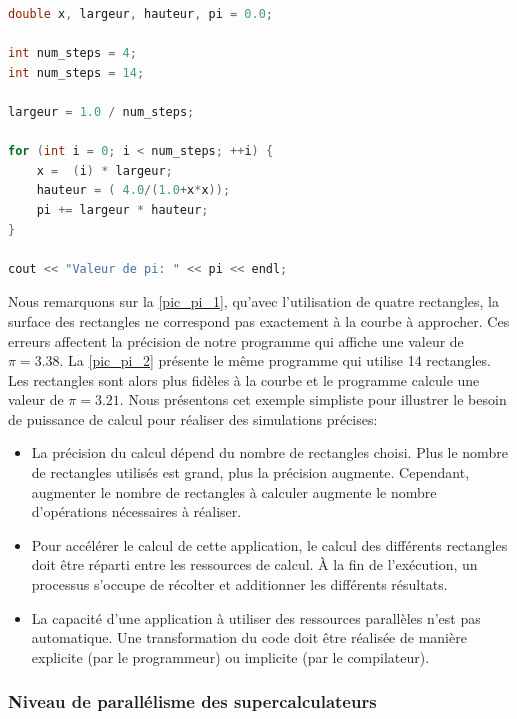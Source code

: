         \begin{lstlisting}[language=C, caption=Implémentation de l'algorithme de calcul d'intégrale par la méthode des rectangles, float,floatplacement=H]
double x, largeur, hauteur, pi = 0.0;

int num_steps = 4;
int num_steps = 14;

largeur = 1.0 / num_steps;

for (int i = 0; i < num_steps; ++i) {
    x =  (i) * largeur;
    hauteur = ( 4.0/(1.0+x*x));
    pi += largeur * hauteur;
}

cout << "Valeur de pi: " << pi << endl;
\end{lstlisting}
    
         Nous remarquons sur la \autoref{pic_pi_1}, qu'avec l'utilisation de quatre rectangles, la surface des rectangles ne correspond pas exactement à la courbe à approcher. Ces erreurs affectent la précision de notre programme qui affiche une valeur de $\pi = 3.38$. La \autoref{pic_pi_2} présente le même programme qui utilise 14 rectangles. Les rectangles sont alors plus fidèles à la courbe et le programme calcule une valeur de $\pi = 3.21$.
        Nous présentons cet exemple simpliste pour illustrer le besoin de puissance de calcul pour réaliser des simulations précises:
        \begin{itemize}
            \item La précision du calcul dépend du nombre de rectangles choisi. Plus le nombre de rectangles utilisés est grand, plus la précision augmente. Cependant, augmenter le nombre de rectangles à calculer augmente le nombre d'opérations nécessaires à réaliser. 
            
            \item Pour accélérer le calcul de cette application, le calcul des différents rectangles doit être réparti entre les ressources de calcul. À la fin de l'exécution, un processus s'occupe de récolter et additionner les différents résultats.
            
            \item La capacité d'une application à utiliser des ressources parallèles n'est pas automatique. Une transformation du code doit être réalisée de manière explicite (par le programmeur) ou implicite (par le compilateur).
        \end{itemize}
        
    \subsubsection{Niveau de parallélisme des supercalculateurs}
    
